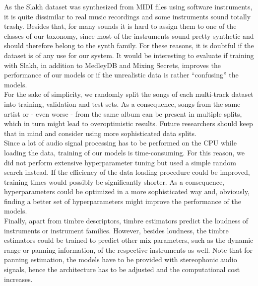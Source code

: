 As the Slakh dataset was synthesized from MIDI files using software instruments, it is quite dissimilar to real music recordings and some instruments sound totally trashy. Besides that, for many sounds it is hard to assign them to one of the classes of our taxonomy, since most of the instruments sound pretty synthetic and should therefore belong to the synth family. For these reasons, it is doubtful if the dataset is of any use for our system. It would be interesting to evaluate if training with Slakh, in addition to MedleyDB and Mixing Secrets, improves the performance of our models or if the unrealistic data is rather \enquote{confusing} the models.\\

For the sake of simplicity, we randomly split the songs of each multi-track dataset into training, validation and test sets. As a consequence, songs from the same artist or - even worse - from the same album can be present in multiple splits, which in turn might lead to overoptimistic results. Future researchers should keep that in mind and consider using more sophisticated data splits.\\

Since a lot of audio signal processing has to be performed on the CPU while loading the data, training of our models is time-consuming. For this reason, we did not perform extensive hyperparameter tuning but used a simple random search instead. If the efficiency of the data loading procedure could be improved, training times would possibly be significantly shorter. As a consequence, hyperparameters could be optimized in a more sophisticated way and, obviously, finding a better set of hyperparameters might improve the performance of the models.\\

Finally, apart from timbre descriptors, timbre estimators predict the loudness of instruments or instrument families. However, besides loudness, the timbre estimators could be trained to predict other mix parameters, such as the dynamic range or panning information, of the respective instruments as well. Note that for panning estimation, the models have to be provided with stereophonic audio signals, hence the architecture has to be adjusted and the computational cost increases.\\